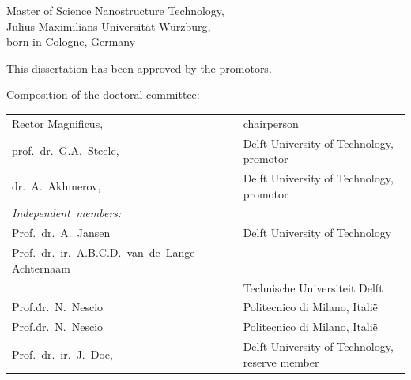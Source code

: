 \begin{titlepage}
\begin{center}
\bigskip
\bigskip

Master of Science Nanostructure Technology, \\
Julius-Maximilians-Universität Würzburg, \\
born in Cologne, Germany

\vspace*{2\bigskipamount}

\end{center}

\clearpage
\thispagestyle{empty}

\noindent This dissertation has been approved by the promotors.

\bigskip
\noindent Composition of the doctoral committee:

\medskip\noindent
\begin{tabular}{p{3cm}l}
    Rector Magnificus, & chairperson \\
    prof.\ dr.\ G.A.\ Steele, & Delft University of Technology, promotor \\
    dr.\ A.\ Akhmerov, & Delft University of Technology, promotor \\

    \medskip
    \mbox{\emph{Independent members:}} & \\

    Prof.\ dr.\ A.\ Jansen & Delft University of Technology \\
    \mbox{Prof.\ dr.\ ir.\ A.B.C.D.\ van de Lange-Achternaam} & \\
      & Technische Universiteit Delft \\
    Prof.\.dr.\ N.\ Nescio & Politecnico di Milano, Itali\"e \\
    Prof.\.dr.\ N.\ Nescio & Politecnico di Milano, Itali\"e \\
    Prof.\ dr.\ ir.\ J.\ Doe, & Delft University of Technology, reserve member \\

\end{tabular}


\end{titlepage}
